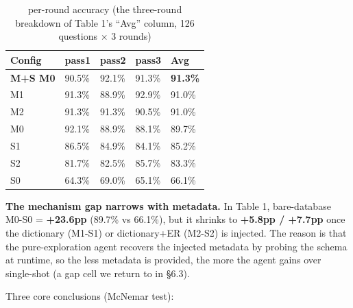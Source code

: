 \documentclass[11pt]{article}
\begin{document}
\begin{table}[htbp]
\centering
\caption{per-round accuracy (the three-round breakdown of Table 1's ``Avg'' column, 126 questions $\times$ 3 rounds)}
\label{tab:2}
\small
\begin{tabular}{@{}lllll@{}}
\toprule
Config & pass1 & pass2 & pass3 & Avg \\
\midrule
\textbf{M+S M0} & 90.5\% & 92.1\% & 91.3\% & \textbf{91.3\%} \\
M1 & 91.3\% & 88.9\% & 92.9\% & 91.0\% \\
M2 & 91.3\% & 91.3\% & 90.5\% & 91.0\% \\
M0 & 92.1\% & 88.9\% & 88.1\% & 89.7\% \\
S1 & 86.5\% & 84.9\% & 84.1\% & 85.2\% \\
S2 & 81.7\% & 82.5\% & 85.7\% & 83.3\% \\
S0 & 64.3\% & 69.0\% & 65.1\% & 66.1\% \\
\bottomrule
\end{tabular}
\end{table}

\textbf{The mechanism gap narrows with metadata.} In Table 1, bare-database M0-S0 = \textbf{+23.6pp} (89.7\% vs 66.1\%), but it shrinks to \textbf{+5.8pp / +7.7pp} once the dictionary (M1-S1) or dictionary+ER (M2-S2) is injected. The reason is that the pure-exploration agent recovers the injected metadata by probing the schema at runtime, so the less metadata is provided, the more the agent gains over single-shot (a gap cell we return to in \S{}6.3).

Three core conclusions (McNemar test):
\end{document}
